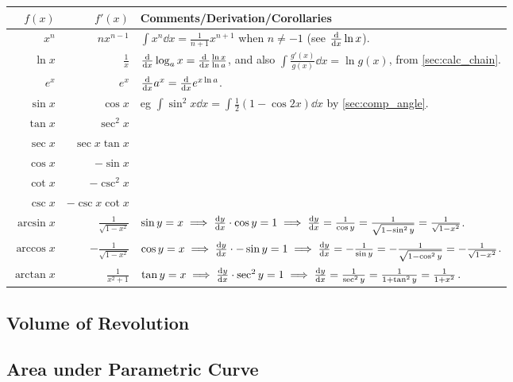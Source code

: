 \documentclass[fleqn,a4paper,11pt]{article}
\begin{document}
    \begin{longtable}{rrl}
    \toprule
    \boldmath\(f(x)\) & \boldmath\(f'(x)\) &
    \bfseries Comments/Derivation/Corollaries \\
    \midrule
    \endhead
    \(x^n\) & \(nx^{n-1}\)
        & \(\int x^n \dd{x} = \frac{1}{n + 1}x^{n + 1}\) when
          \(n \neq -1\) (see \(\dv{}{x}\ln x\)).\\
    \(\ln x\) & \(\frac{1}{x}\)
        & \(\dv{}{x}\log_a x = \dv{}{x} \frac{\ln x}{\ln a}\), and also
          \(\int \frac{g'(x)}{g(x)} \dd{x} = \ln g(x)\),
            from \ref{sec:calc_chain}.\\
    \(e^x\) & \(e^x\) & \(\dv{}{x}a^x = \dv{}{x}e^{x \ln a}\). \\
    \(\sin x\) & \(\cos x\)
        & eg \(\int \sin^2 x \dd{x} = \int \frac 12 (1 - \cos 2x) \dd{x}\)
          by \ref{sec:comp_angle}. \\
    \(\tan x\) & \(\sec^2 x\) \\
    \(\sec x\) & \(\sec x \tan x\) \\
    \(\cos x\) & \(-\sin x\) \\
    \(\cot x\) & \(-\csc^2 x\) \\
    \(\csc x\) & \(-\csc x \cot x\) \\
    \(\arcsin x\) & \(\frac{1}{\sqrt{1 - x^2}}\)
        & \(\sin y = x \implies \dv{y}{x} \cdot \cos y = 1 \implies
           \dv{y}{x} = \frac{1}{\cos y}
         = \frac{1}{\sqrt{1 - \sin^2 y}} = \frac{1}{\sqrt{1 - x^2}}\). \\
    \(\arccos x\) & \(-\frac{1}{\sqrt{1 - x^2}}\)
        & \(\cos y = x \implies \dv{y}{x} \cdot -\sin y = 1 \implies
           \dv{y}{x} = -\frac{1}{\sin y}
         = -\frac{1}{\sqrt{1 - \cos^2 y}} = -\frac{1}{\sqrt{1 - x^2}}\). \\
    \(\arctan x\) & \(\frac{1}{x^2 + 1}\)
        & \(\tan y = x \implies \dv{y}{x} \cdot \sec^2 y = 1 \implies
           \dv{y}{x} = \frac{1}{\sec^2 y} = \frac{1}{1 + \tan^2 y}
         = \frac{1}{1 + x^2}\). \\
    \bottomrule
    \end{longtable}

    \subsection{Volume of Revolution}

    \subsection{Area under Parametric Curve} \label{sec:calc_parametric_area}
\end{document}
